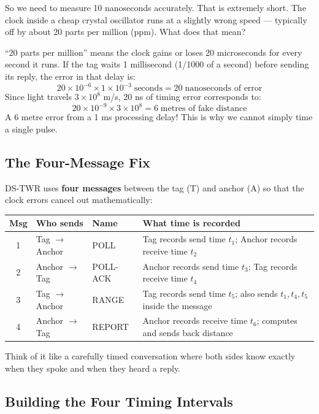 \documentclass[11pt,a4paper]{article}
\begin{document}
So we need to measure 10 nanoseconds accurately. That is extremely short. The clock inside a cheap crystal oscillator runs at a slightly wrong speed --- typically off by about 20 parts per million (ppm). What does that mean?

\begin{worked}
``20 parts per million'' means the clock gains or loses 20 microseconds for every second it runs. If the tag waits 1 millisecond (1/1000 of a second) before sending its reply, the error in that delay is:
\[
20 \times 10^{-6} \times 1 \times 10^{-3} \;\text{seconds} = 20\;\text{nanoseconds of error}
\]
Since light travels $3\times10^8$ m/s, 20 ns of timing error corresponds to:
\[
20 \times 10^{-9} \times 3\times10^8 = 6\;\text{metres of fake distance}
\]
A 6 metre error from a 1 ms processing delay! This is why we cannot simply time a single pulse.
\end{worked}

\subsection{The Four-Message Fix}

DS-TWR uses \textbf{four messages} between the tag (T) and anchor (A) so that the clock errors cancel out mathematically:

\begin{center}
\begin{tabular}{clll}
\toprule
\textbf{Msg} & \textbf{Who sends} & \textbf{Name} & \textbf{What time is recorded} \\
\midrule
1 & Tag $\to$ Anchor & POLL & Tag records send time $t_1$; Anchor records receive time $t_2$ \\
2 & Anchor $\to$ Tag & POLL-ACK & Anchor records send time $t_3$; Tag records receive time $t_4$ \\
3 & Tag $\to$ Anchor & RANGE & Tag records send time $t_5$; also sends $t_1, t_4, t_5$ inside the message \\
4 & Anchor $\to$ Tag & REPORT & Anchor records receive time $t_6$; computes and sends back distance \\
\bottomrule
\end{tabular}
\end{center}

Think of it like a carefully timed conversation where both sides know exactly when they spoke and when they heard a reply.

\subsection{Building the Four Timing Intervals}
\end{document}
